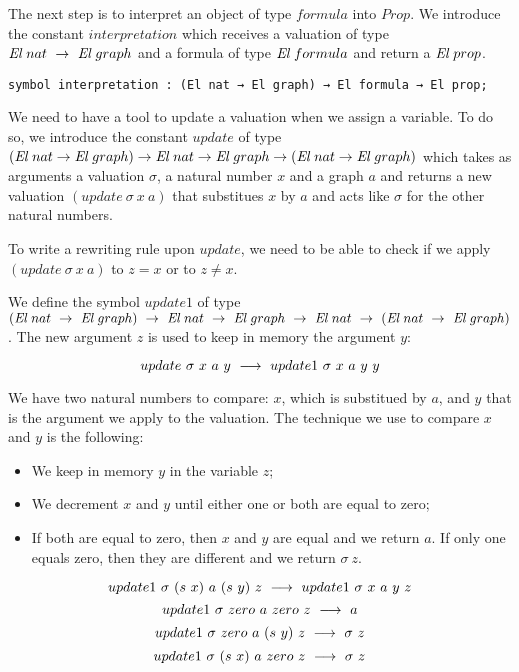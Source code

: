 \documentclass[a4paper]{article}
\begin{document}
The next step is to interpret an object of type $formula$ into $Prop$. We introduce the constant $interpretation$ which receives a valuation of type ${\mbox{\it El}} \ nat \ \rightarrow \ {\mbox{\it El}}~graph$ and a formula of type ${\mbox{\it El}} \ formula$ and return a ${\mbox{\it El}}~prop$.

\begin{lstlisting}
symbol interpretation : (El nat → El graph) → El formula → El prop;
\end{lstlisting} 

We need to have a tool to update a valuation when we assign a variable. To do so, we introduce the constant $update$ of type $(\El \ nat \ra \El~graph) \ra \El \ nat \ra \El~graph \ra (\El \ nat \ra \El~graph)$ which takes as arguments a valuation $\sigma$, a natural number $x$ and a graph $a$ and returns a new valuation $(update \ \sigma \ x \ a)$ that substitues $x$ by $a$ and acts like $\sigma$ for the other natural numbers.

To write a rewriting rule upon $update$, we need to be able to check if we apply $(update \ \sigma \ x \ a)$ to $z = x$ or to $z \neq x$.

We define the symbol $update1$ of type $(\El \ nat \ \ra \ \El~graph) \ \ra \ \El \ nat \ \ra \ \El~graph \ \ra \ \El \ nat \ \ra \ (\El \ nat \ \ra \ \El~graph)$. The new argument $z$ is used to keep in memory the argument $y$:

$$update \ \sigma \ x \ a \ y \ \lra \ update1 \ \sigma \ x \ a \ y \ y$$

We have two natural numbers to compare: $x$, which is substitued by $a$, and $y$ that is the argument we apply to the valuation. The technique we use to compare $x$ and $y$ is the following: 

\begin{itemize}
\item We keep in memory $y$ in the variable $z$;
\item We decrement $x$ and $y$ until either one or both are equal to zero;
\item If both are equal to zero, then $x$ and $y$ are equal and we return $a$. If only one equals zero, then they are different and we return $\sigma \ z$.
\end{itemize}

$$update1 \ \sigma \ (s \ x) \ a \ (s \ y) \ z \ \longrightarrow \ update1 \ \sigma \ x \ a \ y \ z$$
$$ update1 \ \sigma \ zero \ a \ zero \ z \ \lra \ a$$
$$update1 \ \sigma \ zero \ a \ (s \ y) \ z \ \longrightarrow \ \sigma \ z$$
$$update1 \ \sigma \ (s \ x) \ a \ zero \ z \ \longrightarrow \ \sigma \ z$$
\end{document}
